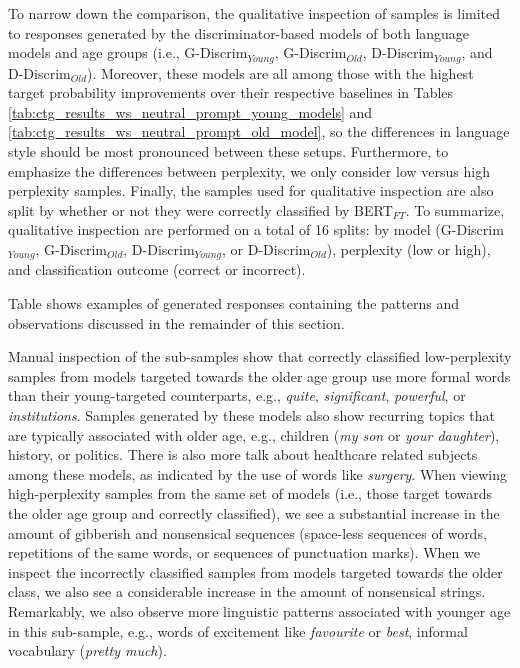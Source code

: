 To narrow down the comparison, the qualitative inspection of samples is limited to responses generated by the discriminator-based models of both language models and age groups (i.e., G-Discrim$_{Young}$, G-Discrim$_{Old}$, D-Discrim$_{Young}$, and D-Discrim$_{Old}$). Moreover, these models are all among those with the highest target probability improvements over their respective baselines in Tables \ref{tab:ctg_results_ws_neutral_prompt_young_models} and \ref{tab:ctg_results_ws_neutral_prompt_old_model}, so the differences in language style should be most pronounced between these setups. Furthermore, to emphasize the differences between perplexity, we only consider low versus high perplexity samples. Finally, the samples used for qualitative inspection are also split by whether or not they were correctly classified by BERT$_{FT}$. To summarize, qualitative inspection are performed on a total of 16 splits: by model (G-Discrim$_{Young}$, G-Discrim$_{Old}$, D-Discrim$_{Young}$, or D-Discrim$_{Old}$), perplexity (low or high), and classification outcome (correct or incorrect).


Table  shows examples of generated responses containing the patterns and observations discussed in the remainder of this section.

Manual inspection of the sub-samples show that correctly classified low-perplexity samples from models targeted towards the older age group use more formal words than their young-targeted counterparts, e.g., \textit{quite}, \textit{significant}, \textit{powerful}, or \textit{institutions}. Samples generated by these models also show recurring topics that are typically associated with older age, e.g., children (\textit{my son} or \textit{your daughter}), history, or politics. There is also more talk about healthcare related subjects among these models, as indicated by the use of words like \textit{surgery}. When viewing high-perplexity samples from the same set of models (i.e., those target towards the older age group and correctly classified), we see a substantial increase in the amount of gibberish and nonsensical sequences (space-less sequences of words, repetitions of the same words, or sequences of punctuation marks). When we inspect the incorrectly classified samples from models targeted towards the older class, we also see a considerable increase in the amount of nonsensical strings. Remarkably, we also observe more linguistic patterns associated with younger age in this sub-sample, e.g., words of excitement like \textit{favourite} or \textit{best}, informal vocabulary (\textit{pretty much}).


